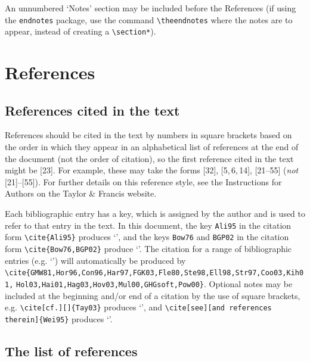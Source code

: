 \documentclass[]{interact}
\theoremstyle{plain}%
\theoremstyle{definition}
\theoremstyle{remark}
\begin{document}
An unnumbered `Notes' section may be included before the References (if using the \verb"endnotes" package, use the command \verb"\theendnotes" where the notes are to appear, instead of creating a \verb"\section*").


\section{References}

\subsection{References cited in the text}

References should be cited in the text by numbers in square brackets based on the order in which they appear in an alphabetical list of references at the end of the document (not the order of citation), so the first reference cited in the text might be [23]. For example, these may take the forms [32], [5,\,6,\,14], [21--55] (\emph{not} [21]--[55]). For further details on this reference style, see the Instructions for Authors on the Taylor \& Francis website.

Each bibliographic entry has a key, which is assigned by the author and is used to refer to that entry in the text. In this document, the key \verb"Ali95" in the citation form \verb"\cite{Ali95}" produces `\cite{Ali95}', and the keys \verb"Bow76" and \verb"BGP02" in the citation form \verb"\cite{Bow76,BGP02}" produce `\cite{Bow76,BGP02}'. The citation for a range of bibliographic entries (e.g. `\cite{GMW81,Hor96,Con96,Har97,FGK03,Fle80,Ste98,Ell98,Str97,Coo03,Kih01,Hol03,Hai01,Hag03,Hov03,Mul00,GHGsoft,Pow00}') will automatically be produced by \verb"\cite{GMW81,Hor96,Con96,Har97,FGK03,Fle80,Ste98,Ell98,Str97,Coo03,Kih01," \verb"Hol03,Hai01,Hag03,Hov03,Mul00,GHGsoft,Pow00}".
Optional notes may be included at the beginning and/or end of a citation by the use of square brackets, e.g. \verb"\cite[cf.][]{Tay03}" produces `\cite[cf.][]{Tay03}', and \verb"\cite[see][and references therein]{Wei95}" produces `\cite[see][and references therein]{Wei95}'.

\subsection{The list of references}
\end{document}
